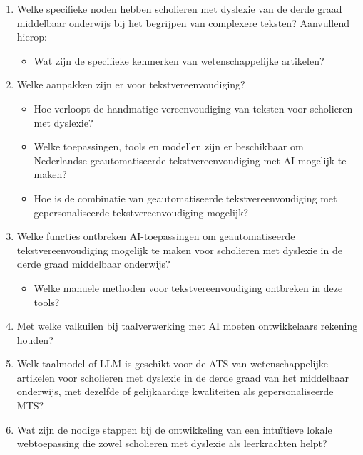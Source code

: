 \begin{enumerate}
	\item Welke specifieke noden hebben scholieren met dyslexie van de derde graad middelbaar onderwijs bij het begrijpen van complexere teksten? Aanvullend hierop: 
	\begin{itemize}
		\item Wat zijn de specifieke kenmerken van wetenschappelijke artikelen?
	\end{itemize} 
	\item Welke aanpakken zijn er voor tekstvereenvoudiging?
	\begin{itemize}
		\item Hoe verloopt de handmatige vereenvoudiging van teksten voor scholieren met dyslexie?
		\item Welke toepassingen, tools en modellen zijn er beschikbaar om Nederlandse geautomatiseerde tekstvereenvoudiging met AI mogelijk te maken?
		\item Hoe is de combinatie van geautomatiseerde tekstvereenvoudiging met gepersonaliseerde  tekstvereenvoudiging mogelijk?
	\end{itemize}
	\item Welke functies ontbreken AI-toepassingen om geautomatiseerde tekstvereenvoudiging mogelijk te maken voor scholieren met dyslexie in de derde graad middelbaar onderwijs? 
	\begin{itemize}
		\item Welke manuele methoden voor tekstvereenvoudiging ontbreken in deze tools?
	\end{itemize}
	\item Met welke valkuilen bij taalverwerking met AI moeten ontwikkelaars rekening houden?
	\item Welk taalmodel of LLM is geschikt voor de ATS van wetenschappelijke artikelen voor scholieren met dyslexie in de derde graad van het middelbaar onderwijs, met dezelfde of gelijkaardige kwaliteiten als gepersonaliseerde MTS?
	\item Wat zijn de nodige stappen bij de ontwikkeling van een intuïtieve lokale webtoepassing die zowel scholieren met dyslexie als leerkrachten helpt?
\end{enumerate}


\section{}%
\label{sec:onderzoeksdoelstelling}

